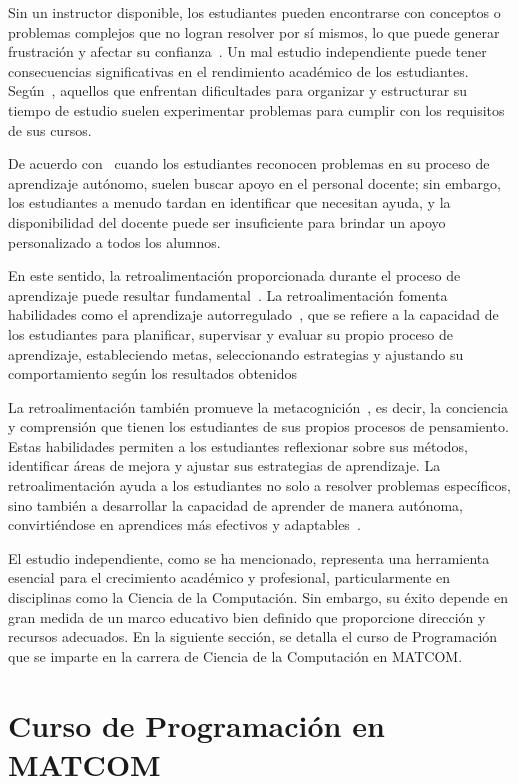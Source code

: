 Sin un instructor disponible, los estudiantes pueden encontrarse con conceptos o problemas complejos que no logran resolver por sí mismos, lo que puede generar frustración y afectar su confianza~\cite{overklift2019}. Un mal estudio independiente puede tener consecuencias significativas en el rendimiento académico de los estudiantes. Según~\cite{overklift2019}, aquellos que enfrentan dificultades para organizar y estructurar su tiempo de estudio suelen experimentar problemas para cumplir con los requisitos de sus cursos.

De acuerdo con~\cite{overklift2019} cuando los estudiantes reconocen problemas en su proceso de aprendizaje autónomo, suelen buscar apoyo en el personal docente; sin embargo, los estudiantes a menudo tardan en identificar que necesitan ayuda, y la disponibilidad del docente puede ser insuficiente para brindar un apoyo personalizado a todos los alumnos.

En este sentido, la retroalimentación proporcionada durante el proceso de aprendizaje puede resultar fundamental~\cite{Sarsa_2022}. La retroalimentación fomenta habilidades como el aprendizaje autorregulado~\cite{Sarsa_2022}, que se refiere a la capacidad de los estudiantes para planificar, supervisar y evaluar su propio proceso de aprendizaje, estableciendo metas, seleccionando estrategias y ajustando su comportamiento según los resultados obtenidos

La retroalimentación también promueve la metacognición~\cite{Sarsa_2022}, es decir, la conciencia y comprensión que tienen los estudiantes de sus propios procesos de pensamiento. Estas habilidades permiten a los estudiantes reflexionar sobre sus métodos, identificar áreas de mejora y ajustar sus estrategias de aprendizaje. La retroalimentación ayuda a los estudiantes no solo a resolver problemas específicos, sino también a desarrollar la capacidad de aprender de manera autónoma, convirtiéndose en aprendices más efectivos y adaptables~\cite{shute2008focus}.

El estudio independiente, como se ha mencionado, representa una herramienta esencial para el crecimiento académico y profesional, particularmente en disciplinas como la Ciencia de la Computación. Sin embargo, su éxito depende en gran medida de un marco educativo bien definido que proporcione dirección y recursos adecuados. En la siguiente sección, se detalla el curso de Programación que se imparte en la carrera de Ciencia de la Computación en \mbox{MATCOM}.

\section{Curso de Programación en \mbox{MATCOM}}\label{sec:matcom}

